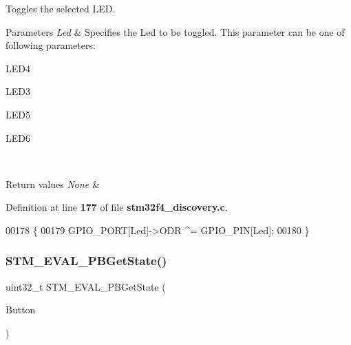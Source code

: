 Toggles the selected L\+ED. 


\begin{DoxyParams}{Parameters}
{\em Led} & Specifies the Led to be toggled. This parameter can be one of following parameters\+: \begin{DoxyItemize}
\item L\+E\+D4 \item L\+E\+D3 \item L\+E\+D5 \item L\+E\+D6 \end{DoxyItemize}
\\
\hline
\end{DoxyParams}

\begin{DoxyRetVals}{Return values}
{\em None} & \\
\hline
\end{DoxyRetVals}


Definition at line \textbf{ 177} of file \textbf{ stm32f4\+\_\+discovery.\+c}.


\begin{DoxyCode}
00178 \{
00179   GPIO_PORT[Led]->ODR ^= GPIO_PIN[Led];
00180 \}
\end{DoxyCode}
\mbox{\label{group__STM32F4__DISCOVERY__LOW__LEVEL__Exported__Functions_ga812ee2a84aaed235587ac81eb9269442}} 
\subsubsection{S\+T\+M\+\_\+\+E\+V\+A\+L\+\_\+\+P\+B\+Get\+State()}
{\footnotesize\ttfamily uint32\+\_\+t S\+T\+M\+\_\+\+E\+V\+A\+L\+\_\+\+P\+B\+Get\+State (\begin{DoxyParamCaption}\item[{\textbf{ Button\+\_\+\+Type\+Def}}]{Button }\end{DoxyParamCaption})}



